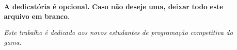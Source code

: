 \begin{dedicatoria}
   \vspace*{\fill}
   \centering
   \noindent
	\textbf{A dedicatória é opcional. Caso não deseje uma, deixar todo este
	arquivo em branco}.

   \textit{Este trabalho é dedicado aos novos estudantes de programação competitiva do gama.} \vspace*{\fill}
\end{dedicatoria}
